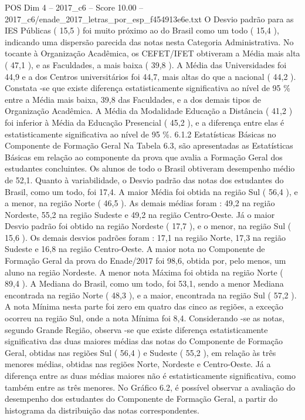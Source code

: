 \begin{textsample}{POS Dim 4 – 2017\_c6 – Score 10.00 – 2017\_c6/enade\_2017\_letras\_por\_esp\_f454913e6e.txt}
O Desvio padrão para as IES Públicas ( 15,5 ) foi muito próximo ao do Brasil como um todo ( 15,4 ), indicando uma dispersão parecida das notas nesta Categoria Administrativa.
No tocante à Organização Acadêmica, os CEFET/IFET obtiveram a Média mais alta ( 47,1 ), e as Faculdades, a mais baixa ( 39,8 ).
A Média das Universidades foi 44,9 e a dos Centros universitários foi 44,7, mais altas do que a nacional ( 44,2 ).
Constata -se que existe diferença estatisticamente significativa ao nível de 95 \% entre a Média mais baixa, 39,8 das Faculdades, e a dos demais tipos de Organização Acadêmica.
A Média da Modalidade Educação a Distância ( 41,2 ) foi inferior à Média da Educação Presencial ( 45,2 ), e a diferença entre elas é estatisticamente significativa ao nível de 95 \%. 6.1.2 Estatísticas Básicas no Componente de Formação Geral Na Tabela 6.3, são apresentadas as Estatísticas Básicas em relação ao componente da prova que avalia a Formação Geral dos estudantes concluintes.
Os alunos de todo o Brasil obtiveram desempenho médio de 52,1.
Quanto à variabilidade, o Desvio padrão das notas dos estudantes do Brasil, como um todo, foi 17,4.
A maior Média foi obtida na região Sul ( 56,4 ), e a menor, na região Norte ( 46,5 ).
As demais médias foram : 49,2 na região Nordeste, 55,2 na região Sudeste e 49,2 na região Centro-Oeste.
Já o maior Desvio padrão foi obtido na região Nordeste ( 17,7 ), e o menor, na região Sul ( 15,6 ).
Os demais desvios padrões foram : 17,1 na região Norte, 17,3 na região Sudeste e 16,8 na região Centro-Oeste.
A maior nota no Componente de Formação Geral da prova do Enade/2017 foi 98,6, obtida por, pelo menos, um aluno na região Nordeste.
A menor nota Máxima foi obtida na região Norte ( 89,4 ).
A Mediana do Brasil, como um todo, foi 53,1, sendo a menor Mediana encontrada na região Norte ( 48,3 ), e a maior, encontrada na região Sul ( 57,2 ).
A nota Mínima nesta parte foi zero em quatro das cinco as regiões, a exceção ocorreu na região Sul, onde a nota Mínima foi 8,4.
Considerando -se as notas, segundo Grande Região, observa -se que existe diferença estatisticamente significativa das duas maiores médias das notas do Componente de Formação Geral, obtidas nas regiões Sul ( 56,4 ) e Sudeste ( 55,2 ), em relação às três menores médias, obtidas nas regiões Norte, Nordeste e Centro-Oeste.
Já a diferença entre as duas médias maiores não é estatisticamente significativa, como também entre as três menores.
No Gráfico 6.2, é possível observar a avaliação do desempenho dos estudantes do Componente de Formação Geral, a partir do histograma da distribuição das notas correspondentes.

\end{textsample}
